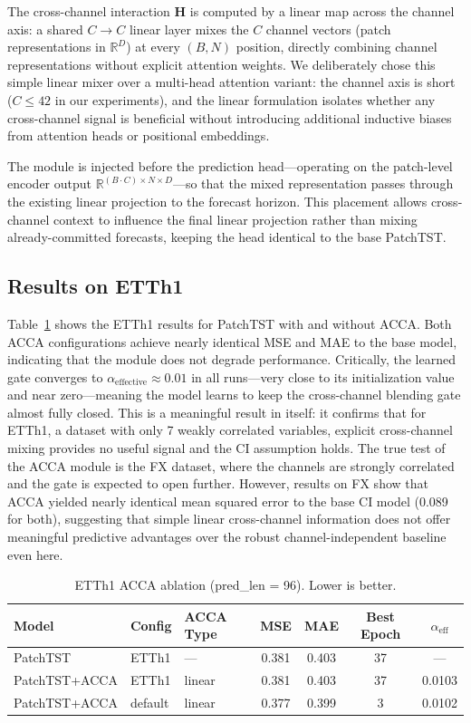 \documentclass[11pt]{article}
\begin{document}
The cross-channel interaction $\mathbf{H}$ is computed by a linear map across the channel axis: a shared $C \to C$ linear layer mixes the $C$ channel vectors (patch representations in $\mathbb{R}^D$) at every $(B, N)$ position, directly combining channel representations without explicit attention weights. We deliberately chose this simple linear mixer over a multi-head attention variant: the channel axis is short ($C \leq 42$ in our experiments), and the linear formulation isolates whether any cross-channel signal is beneficial without introducing additional inductive biases from attention heads or positional embeddings.

The module is injected before the prediction head---operating on the patch-level encoder output $\mathbb{R}^{(B \cdot C) \times N \times D}$---so that the mixed representation passes through the existing linear projection to the forecast horizon. This placement allows cross-channel context to influence the final linear projection rather than mixing already-committed forecasts, keeping the head identical to the base PatchTST.

\subsection{Results on ETTh1}

Table~\ref{tab:acca_results} shows the ETTh1 results for PatchTST with and without ACCA. Both ACCA configurations achieve nearly identical MSE and MAE to the base model, indicating that the module does not degrade performance. Critically, the learned gate converges to $\alpha_{\text{effective}} \approx 0.01$ in all runs—very close to its initialization value and near zero—meaning the model learns to keep the cross-channel blending gate almost fully closed. This is a meaningful result in itself: it confirms that for ETTh1, a dataset with only 7 weakly correlated variables, explicit cross-channel mixing provides no useful signal and the CI assumption holds. The true test of the ACCA module is the FX dataset, where the channels are strongly correlated and the gate is expected to open further. However, results on FX show that ACCA yielded nearly identical mean squared error to the base CI model (0.089 for both), suggesting that simple linear cross-channel information does not offer meaningful predictive advantages over the robust channel-independent baseline even here.

\begin{table}[h]
\centering
\caption{ETTh1 ACCA ablation (pred\_len = 96). Lower is better.}
\label{tab:acca_results}
\begin{tabular}{lllcccc}
\toprule
Model & Config & ACCA Type & MSE & MAE & Best Epoch & $\alpha_{\text{eff}}$ \\
\midrule
PatchTST      & ETTh1   & —      & 0.381 & 0.403 & 37 & — \\
PatchTST+ACCA & ETTh1   & linear & 0.381 & 0.403 & 37 & 0.0103 \\
PatchTST+ACCA & default & linear & 0.377 & 0.399 & 3  & 0.0102 \\
\bottomrule
\end{tabular}
\end{table}
\end{document}

